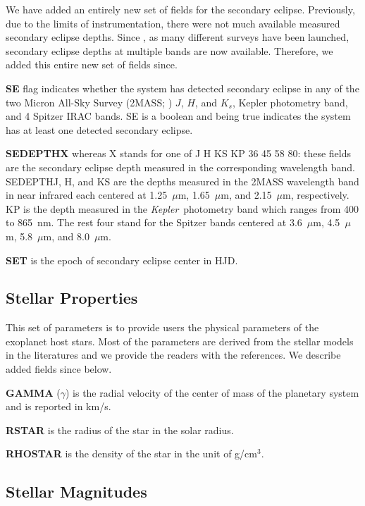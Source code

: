 \documentclass[11pt,preprint]{aastex}
\def\micron{$\mu$m}
\def\kepler{\textit{Kepler}}
\def\micron{$\mu$m}
\begin{document}
\begin{CJK*}{UTF8}{gbsn}
We have added an entirely new set of fields for the secondary
eclipse. Previously, due to the limits of instrumentation, there were
not much available measured secondary eclipse depths. Since
\cite{Wright2011}, as many different surveys have been launched,
secondary eclipse depths at multiple bands are now
available. Therefore, we added this entire new set of fields since.

{\bf SE} flag indicates whether the system has detected secondary
eclipse in any of the two Micron All-Sky Survey (2MASS;
\citealt{Skrustskie2006}) $J$, $H$, and $K_s$, Kepler photometry band,
and 4 Spitzer IRAC bands. SE is a boolean and being true indicates the
system has at least one detected secondary eclipse.

{\bf SEDEPTHX} whereas X stands for one of J H KS KP 36 45 58 80:
these fields are the secondary eclipse depth measured in the
corresponding wavelength band. SEDEPTHJ, H, and KS are the depths
measured in the 2MASS wavelength band in near infrared each centered
at 1.25~\micron, 1.65~\micron, and 2.15~\micron, respectively. KP is
the depth measured in the \kepler\ photometry band which ranges from
400 to 865~nm. The rest four stand for the Spitzer bands centered at
3.6~\micron, 4.5~\micron, 5.8~\micron, and 8.0~\micron.

{\bf SET} is the epoch of secondary eclipse center in HJD.

\subsection{Stellar Properties}\label{sec:stellarprop}

This set of parameters is to provide users the physical parameters of
the exoplanet host stars.  Most of the parameters are derived from the
stellar models in the literatures and we provide the readers with the
references. We describe added fields since \cite{Wright2011} below.

{\bf GAMMA} ($\gamma$) is the radial velocity of the center of mass of
the planetary system and is reported in km/s.

{\bf RSTAR} is the radius of the star in the solar radius.

{\bf RHOSTAR} is the density of the star in the unit of g/cm$^3$.

\subsection{Stellar Magnitudes}\label{sec:stellarmag}


\end{CJK*}
\end{document}
